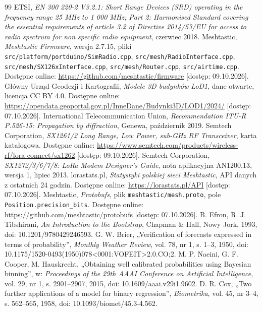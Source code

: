 \documentclass[12pt,a4paper,twoside]{report}
\theoremstyle{definition} %
\begin{document}
\begin{thebibliography}{99}
     ETSI, \emph{EN 300 220-2 V3.2.1: Short Range Devices (SRD) operating in the frequency range 25 MHz to 1 000 MHz; Part 2: Harmonised Standard covering the essential requirements of article 3.2 of Directive 2014/53/EU for access to radio spectrum for non specific radio equipment}, czerwiec 2018.
     Meshtastic, \emph{Meshtastic Firmware}, wersja 2.7.15, pliki \texttt{src/platform/portduino/SimRadio.cpp}, \texttt{src/mesh/RadioInterface.cpp}, \texttt{src/mesh/SX126xInterface.cpp}, \texttt{src/mesh/Router.cpp}, \texttt{src/airtime.cpp}. Dostępne online: \url{https://github.com/meshtastic/firmware} [dostęp: 09.10.2026].
     Główny Urząd Geodezji i Kartografii, \emph{Modele 3D budynków LoD1}, dane otwarte, licencja CC BY 4.0. Dostępne online: \url{https://opendata.geoportal.gov.pl/InneDane/Budynki3D/LOD1/2024/} [dostęp: 07.10.2026].
     International Telecommunication Union, \emph{Recommendation ITU-R P.526-15: Propagation by diffraction}, Genewa, październik 2019.
     Semtech Corporation, \emph{SX1261/2 Long Range, Low Power, sub-GHz RF Transceiver}, karta katalogowa. Dostępne online: \url{https://www.semtech.com/products/wireless-rf/lora-connect/sx1262} [dostęp: 09.10.2026].
     Semtech Corporation, \emph{SX1272/3/6/7/8: LoRa Modem Designer's Guide}, nota aplikacyjna AN1200.13, wersja 1, lipiec 2013.
     lorastats.pl, \emph{Statystyki polskiej sieci Meshtastic}, API danych z ostatnich 24 godzin. Dostępne online: \url{https://lorastats.pl/API} [dostęp: 07.10.2026].
     Meshtastic, \emph{Protobufs}, plik \texttt{meshtastic/mesh.proto}, pole \texttt{Position.precision\_bits}. Dostępne online: \url{https://github.com/meshtastic/protobufs} [dostęp: 07.10.2026].
     B. Efron, R. J. Tibshirani, \emph{An Introduction to the Bootstrap}, Chapman \& Hall, Nowy Jork, 1993, doi: 10.1201/9780429246593.
     G. W. Brier, „Verification of forecasts expressed in terms of probability”, \emph{Monthly Weather Review}, vol. 78, nr 1, s. 1--3, 1950, doi: 10.1175/1520-0493(1950)078<0001:VOFEIT>2.0.CO;2.
     M. P. Naeini, G. F. Cooper, M. Hauskrecht, „Obtaining well calibrated probabilities using Bayesian binning”, w: \emph{Proceedings of the 29th AAAI Conference on Artificial Intelligence}, vol. 29, nr 1, s. 2901--2907, 2015, doi: 10.1609/aaai.v29i1.9602.
     D. R. Cox, „Two further applications of a model for binary regression”, \emph{Biometrika}, vol. 45, nr 3--4, s. 562--565, 1958, doi: 10.1093/biomet/45.3-4.562.

\end{thebibliography}
\end{document}
